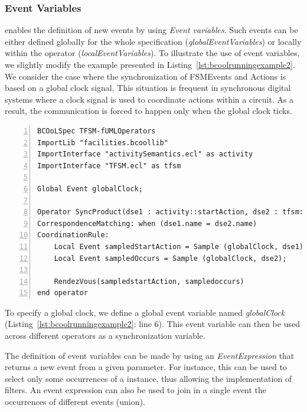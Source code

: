 \subsubsection{Event Variables}
\bcool enables the definition of new events by using \emph{Event variables}. Such events can be either defined globally for the whole specification (\emph{globalEventVariables}) or locally within the operator (\emph{localEventVariables}). To illustrate the use of event variables, we slightly modify the example presented in Listing~\ref{lst:bcoolrunningexample2}. We consider the case where the synchronization of FSMEvents and Actions is based on a global clock signal. This situation is frequent in synchronous digital systems where a clock signal is used to coordinate actions within a circuit. As a result, the communication is forced to happen only when the global clock ticks. 

\begin{lstlisting}[language=bcool,
caption={Synchronized product operator between the TFSM and Activity languages by using Event Variables},
label={lst:bcoolrunningexample2}, 
basicstyle=\scriptsize\ttfamily, backgroundcolor=\color{LGrey}, numbers=left, xleftmargin=2pt]
BCOoLSpec TFSM-fUMLOperators
ImportLib "facilities.bcoollib"
ImportInterface "activitySemantics.ecl" as activity
ImportInterface "TFSM.ecl" as tfsm

Global Event globalClock;

Operator SyncProduct(dse1 : activity::startAction, dse2 : tfsm::occurs)
CorrespondenceMatching: when (dse1.name = dse2.name)
CoordinationRule: 
	Local Event sampledStartAction = Sample (globalClock, dse1);
	Local Event sampledOccurs = Sample (globalClock, dse2);
	
	RendezVous(sampledstartAction, sampledoccurs)
end operator
\end{lstlisting}

To specify a global clock, we define a global event variable named \emph{globalClock} (Listing~\ref{lst:bcoolrunningexample2}: line 6). This event variable can then be used across different operators as a synchronization variable. %

The definition of event variables can be made by using an \emph{EventExpression} that returns a new event from a given parameter. For instance, this can be used to select only some occurrences of a \dse instance, thus allowing the implementation of filters. An event expression can also be used to join in a single event the occurrences of different events (union). 

